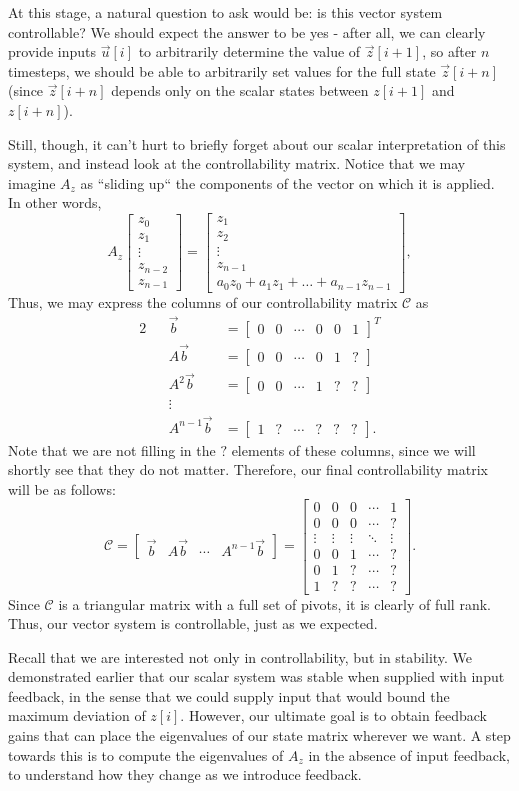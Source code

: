 \documentclass[letterpaper]{article}
\theoremstyle{remark}
\newcommand{\mat}[1]{\ensuremath{\begin{bmatrix}#1\end{bmatrix}}}
\newcommand{\eqn}[1]{\begin{alignat*}{2}#1\end{alignat*}}
\begin{document}
At this stage, a natural question to ask would be: is this vector system controllable? We should expect the answer to be yes - after all, we can clearly provide inputs $\vec{u}[i]$ to arbitrarily determine the value of $\vec{z}[i + 1]$, so after $n$ timesteps, we should be able to arbitrarily set values for the full state $\vec{z}[i + n]$ (since $\vec{z}[i + n]$ depends only on the scalar states between $z[i + 1]$ and $z[i + n]$).

Still, though, it can't hurt to briefly forget about our scalar interpretation of this system, and instead look at the controllability matrix. Notice that we may imagine $A_z$ as ``sliding up`` the components of the vector on which it is applied. In other words,
\[
    A_z\mat{z_0 \\ z_1 \\ \vdots \\ z_{n-2} \\ z_{n-1}} = \mat{z_1 \\ z_2 \\ \vdots \\ z_{n-1} \\ a_0z_0 + a_1z_1 + \ldots + a_{n-1}z_{n-1}},
\]
Thus, we may express the columns of our controllability matrix $\mathscr{C}$ as
\eqn{
    && \vec{b} &= \mat{0 & 0 & \cdots & 0 & 0 & 1}^T \\
    && A\vec{b} &= \mat{0 & 0 & \cdots & 0 & 1 & ?} \\
    && A^2\vec{b} &= \mat{0 & 0 & \cdots & 1 & ? & ?} \\
    && \vdots & \\
    && A^{n-1}\vec{b} &= \mat{1 & ? & \cdots & ? & ? & ?}.
}
Note that we are not filling in the $?$ elements of these columns, since we will shortly see that they do not matter. Therefore, our final controllability matrix will be as follows:
\[
    \mathscr{C} = \mat{\vec{b} & A\vec{b} & \cdots & A^{n-1}\vec{b}} = 
    \mat{
    0 & 0 & 0 & \cdots & 1 \\
    0 & 0 & 0 & \cdots & ? \\
    \vdots & \vdots & \vdots & \ddots & \vdots \\
    0 & 0 & 1 & \cdots & ? \\
    0 & 1 & ? & \cdots & ? \\
    1 & ? & ? & \cdots & ?
    }.
\]
Since $\mathscr{C}$ is a triangular matrix with a full set of pivots, it is clearly of full rank. Thus, our vector system is controllable, just as we expected.

Recall that we are interested not only in controllability, but in stability. We demonstrated earlier that our scalar system was stable when supplied with input feedback, in the sense that we could supply input that would bound the maximum deviation of $z[i]$. However, our ultimate goal is to obtain feedback gains that can place the eigenvalues of our state matrix wherever we want. A step towards this is to compute the eigenvalues of $A_z$ in the absence of input feedback, to understand how they change as we introduce feedback.
\end{document}
